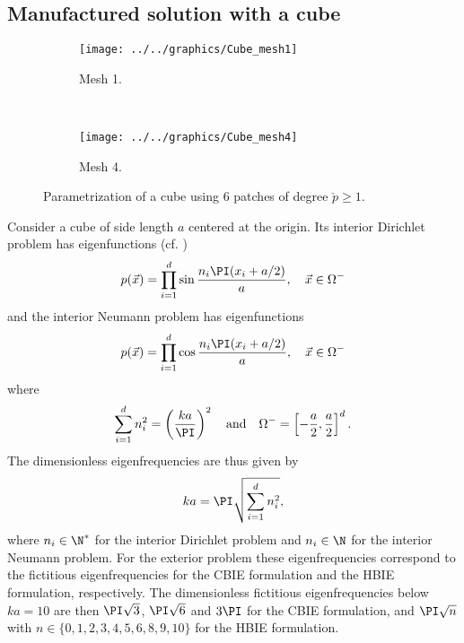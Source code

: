 \subsection{Manufactured solution with a cube}
\begin{figure}
	\centering
	\begin{subfigure}[t]{0.3\textwidth}
		\texttt{[image: ../../graphics/Cube\_mesh1]}
		\caption{Mesh 1.}
		\label{Fig3:Cube_mesh1}
	\end{subfigure} 
	~
	\begin{subfigure}[t]{0.3\textwidth}
		\texttt{[image: ../../graphics/Cube\_mesh4]}
		\caption{Mesh 4.}
		\label{Fig3:Cube_mesh4}
	\end{subfigure} 
	\caption{Parametrization of a cube using 6 patches of degree $\check{p}\geq 1$.}
	\label{Fig3:CubeParametrizations}
\end{figure}
Consider a cube of side length $a$ centered at the origin. Its interior Dirichlet problem has eigenfunctions (cf. \cite[p. 52]{Schenck1968iif})
\begin{equation*}
	p(\vec{x}) = \prod_{i=1}^d\sin\frac{n_i\PI (x_i+a/2)}{a},\quad \vec{x}\in\Omega^-
\end{equation*}
and the interior Neumann problem has eigenfunctions
\begin{equation*}
	p(\vec{x}) = \prod_{i=1}^d\cos\frac{n_i\PI (x_i+a/2)}{a},\quad \vec{x}\in\Omega^-
\end{equation*}
where
\begin{equation*}
	\sum_{i=1}^d n_i^2 = \left(\frac{ka}{\PI}\right)^2\quad\text{and}\quad\Omega^-=\left[-\frac{a}{2},\frac{a}{2}\right]^d.
\end{equation*}
The dimensionless eigenfrequencies are thus given by
\begin{equation*}
	ka=\PI\sqrt{\sum_{i=1}^d n_i^2},
\end{equation*}
where $n_i\in\N^*$ for the interior Dirichlet problem and $n_i\in\N$ for the interior Neumann problem. For the exterior problem these eigenfrequencies correspond to the fictitious eigenfrequencies for the CBIE formulation and the HBIE formulation, respectively. The dimensionless fictitious eigenfrequencies below $ka=10$ are then $\PI\sqrt{3}$, $\PI\sqrt{6}$ and $3\PI$ for the CBIE formulation, and $\PI\sqrt{n}$ with $n\in\{0,1,2,3,4,5,6,8,9,10\}$ for the HBIE formulation.

